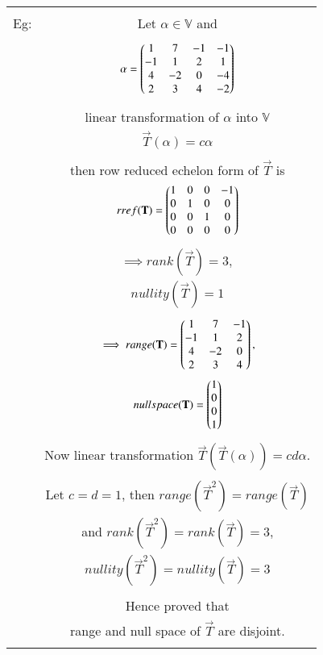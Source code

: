 \documentclass[journal,12pt,twocolumn]{IEEEtran}
\begin{document}
\begin{table}[h!]
\begin{center}
\begin{tabular}{|c|c|}
\hline
& \\
Eg: & Let $\alpha \in \mathbb{V}$ and\\
& \\
& $\alpha = \begin{pmatrix}1&7&-1&-1\\-1&1&2&1\\4&-2&0&-4\\2&3&4&-2\end{pmatrix}$\\
& \\
& linear transformation of $\alpha$ into $\mathbb{V}$\\
& $\vec{T}(\alpha) = c\alpha$\\
& \\
& then row reduced echelon form of $\vec{T}$ is\\
& $rref(\mathbf{T}) = \begin{pmatrix}1&0&0&-1\\0&1&0&0\\0&0&1&0\\0&0&0&0\end{pmatrix}$\\
& \\
& $\implies rank(\vec{T}) = 3,$\\
& $nullity(\vec{T}) = 1$\\
& \\
& $\implies range(\mathbf{T}) = \begin{pmatrix}1&7&-1\\-1&1&2\\4&-2&0\\2&3&4\end{pmatrix},$\\
& $null space(\mathbf{T}) = \begin{pmatrix}1\\0\\0\\1\end{pmatrix}$\\
& \\
& Now linear transformation $\vec{T}(\vec{T}(\alpha)) = cd\alpha$.\\
& \\
& Let $ c = d = 1$, then $range(\vec{T}^2) = range (\vec{T})$\\
& and $rank (\vec{T}^2) = rank (\vec{T}) = 3$,\\
& $nullity (\vec{T}^2) = nullity (\vec{T}) = 3$\\
& \\
& Hence proved that\\
& range and null space of $\vec{T}$ are disjoint.\\
& \\
\hline
\end{tabular}
\end{center}
\end{table}
\end{document}
